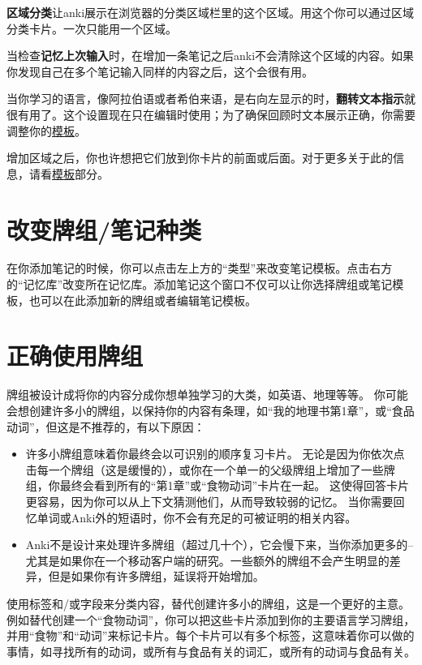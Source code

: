 \documentclass[a4paper]{book}
\begin{document}
	\textbf{区域分类}让anki展示在浏览器的分类区域栏里的这个区域。用这个你可以通过区域分类卡片。一次只能用一个区域。
	
	当检查\textbf{记忆上次输入}时，在增加一条笔记之后anki不会清除这个区域的内容。如果你发现自己在多个笔记输入同样的内容之后，这个会很有用。
	
	当你学习的语言，像阿拉伯语或者希伯来语，是右向左显示的时，\textbf{翻转文本指示}就很有用了。这个设置现在只在编辑时使用；为了确保回顾时文本展示正确，你需要调整你的\hyperref[templates]{模板}。
	
	增加区域之后，你也许想把它们放到你卡片的前面或后面。对于更多关于此的信息，请看\hyperref[templates]{模板}部分。              
	
	\section{改变牌组/笔记种类}
	
	在你添加笔记的时候，你可以点击左上方的“类型”来改变笔记模板。点击右方的“记忆库”改变所在记忆库。添加笔记这个窗口不仅可以让你选择牌组或笔记模板，也可以在此添加新的牌组或者编辑笔记模板。
	
	\section{正确使用牌组}\label{manydecks}
	牌组被设计成将你的内容分成你想单独学习的大类，如英语、地理等等。 你可能会想创建许多小的牌组，以保持你的内容有条理，如“我的地理书第1章”，或“食品动词”，但这是不推荐的，有以下原因：
	
	\begin{itemize}
		\itemsep1pt\parskip0pt
		\item 许多小牌组意味着你最终会以可识别的顺序复习卡片。 无论是因为你依次点击每一个牌组（这是缓慢的），或你在一个单一的父级牌组上增加了一些牌组，你最终会看到所有的“第1章”或“食物动词”卡片在一起。 这使得回答卡片更容易，因为你可以从上下文猜测他们，从而导致较弱的记忆。 当你需要回忆单词或Anki外的短语时，你不会有充足的可被证明的相关内容。
		\item Anki不是设计来处理许多牌组（超过几十个），它会慢下来，当你添加更多的–尤其是如果你在一个移动客户端的研究。一些额外的牌组不会产生明显的差异，但是如果你有许多牌组，延误将开始增加。
	\end{itemize}
	
	使用标签和/或字段来分类内容，替代创建许多小的牌组，这是一个更好的主意。例如替代创建一个“食物动词”，你可以把这些卡片添加到你的主要语言学习牌组，并用“食物”和“动词”来标记卡片。每个卡片可以有多个标签，这意味着你可以做的事情，如寻找所有的动词，或所有与食品有关的词汇，或所有的动词与食品有关。
	
\end{document}
